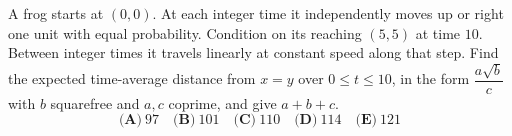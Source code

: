 A frog starts at $(0,0)$. At each integer time it independently moves up or right one unit with equal probability. Condition on its reaching $(5,5)$ at time $10$. Between integer times it travels linearly at constant speed along that step. Find the expected time-average distance from $x=y$ over $0\le t\le10$, in the form $\dfrac{a\sqrt b}{c}$ with $b$ squarefree and $a,c$ coprime, and give $a+b+c$.
\[\textbf{(A)}~97\quad\textbf{(B)}~101\quad\textbf{(C)}~110\quad\textbf{(D)}~114\quad\textbf{(E)}~121\]
